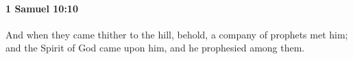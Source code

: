 
		\paragraph{1 Samuel 10:10} %
			\label{1SAMUEL-10-10}

			And when they came thither to the hill, behold, a company of prophets met him; and the Spirit of God came upon him, and he prophesied among them.


